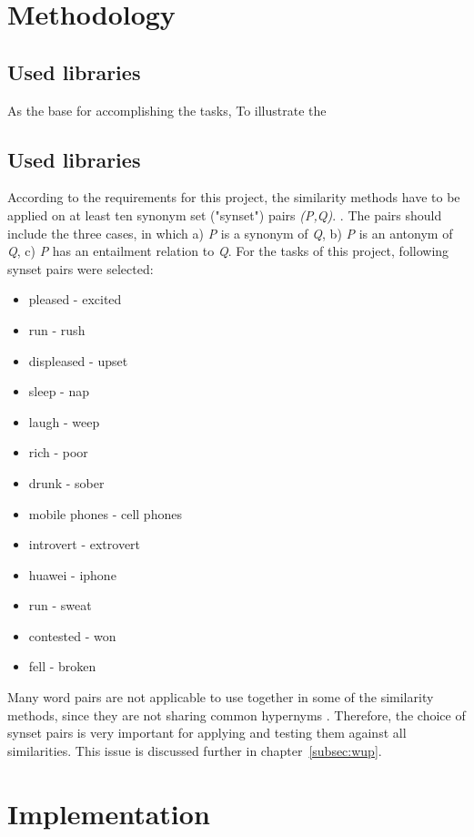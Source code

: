 \documentclass[conference]{IEEEtran}
\begin{document}
\section{Methodology}\label{sec:methodology}

\subsection{Used libraries}
As the base for accomplishing the tasks, To illustrate the

\subsection{Used libraries}
According to the requirements for this project, the similarity methods have to be applied on at least ten synonym set ("synset") pairs \textit{(P,Q)}. . The pairs should include the three cases, in which a) \textit{P} is a synonym of \textit{Q}, b) \textit{P} is an antonym of \textit{Q}, c) \textit{P} has an entailment relation to \textit{Q}. For the tasks of this project, following synset pairs were selected:
\begin{itemize}
\item pleased - excited
\item run - rush
\item displeased - upset
\item sleep - nap
\item laugh - weep
\item rich - poor
\item drunk - sober
\item mobile phones - cell phones
\item introvert - extrovert
\item huawei - iphone
\item run - sweat
\item contested - won
\item fell - broken
\end{itemize}
Many word pairs are not applicable to use together in some of the similarity methods, since they are not sharing common hypernyms \cite{perkins}. Therefore, the choice of synset pairs is very important for applying and testing them against all similarities. This issue is discussed further in chapter~\ref{subsec:wup}.

\section{Implementation}\label{sec:implementation}
\end{document}
